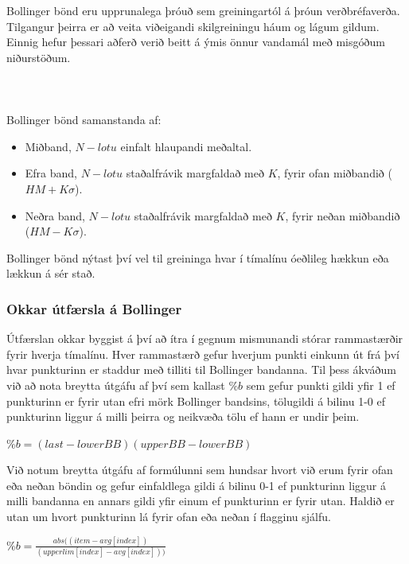 \documentclass{article}
\begin{document}
Bollinger bönd eru upprunalega þróuð sem greiningartól
á þróun verðbréfaverða. 
Tilgangur þeirra er að veita viðeigandi skilgreiningu háum og lágum gildum. Einnig hefur þessari 
aðferð verið beitt á ýmis önnur vandamál með misgóðum niðurstöðum. \\
\hfil \\
\hfil \\
\hfil \\
Bollinger bönd samanstanda af:
\begin{itemize}
  \item Miðband, $N-lotu$ einfalt hlaupandi meðaltal.
  \item Efra band, $N-lotu$ staðalfrávik margfaldað með $K$, fyrir ofan miðbandið ($HM + K\sigma$).
  \item Neðra band, $N-lotu$ staðalfrávik margfaldað með $K$, fyrir neðan miðbandið ($HM -K\sigma$).
\end{itemize}


Bollinger bönd nýtast því vel til greininga hvar í
tímalínu óeðlileg hækkun eða lækkun á sér stað.



\subsubsection{Okkar útfærsla á Bollinger}
Útfærslan okkar byggist á því að ítra í gegnum
mismunandi stórar rammastærðir fyrir hverja tímalínu.
Hver rammastærð gefur hverjum punkti einkunn út frá því
hvar punkturinn er staddur með tilliti til Bollinger
bandanna.
Til þess ákváðum við að nota breytta útgáfu af því sem
kallast $\%b$ sem gefur punkti gildi yfir 1 ef
punkturinn er fyrir utan 
efri mörk Bollinger bandsins, tölugildi á bilinu 1-0 ef
punkturinn liggur á milli þeirra og neikvæða tölu ef
hann er undir þeim.

\begin{center}
  $\%b={(last-lowerBB)}{(upperBB-lowerBB)}$
\end{center}

Við notum breytta útgáfu af formúlunni sem hundsar
hvort við erum fyrir ofan eða neðan böndin og gefur
einfaldlega gildi á bilinu
0-1 ef punkturinn liggur á milli bandanna en annars
gildi yfir einum ef punkturinn er fyrir utan. Haldið er
utan um hvort punkturinn 
lá fyrir ofan eða neðan í flagginu sjálfu.

\begin{center}
  $\%b=\frac{abs((item - avg[index])}{(upperlim[index] - avg[index]))}$
\end{center}
\end{document}
